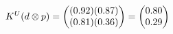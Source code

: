 \documentclass[preview]{standalone}
\begin{document}
\begin{align*}
\special{dvisvgm:raw <g id='unique000'>}K^U(d \otimes p) = \begin{pmatrix} (0.92)(0.87) \\ (0.81)(0.36) \end{pmatrix} = \begin{pmatrix} 0.80 \\ 0.29 \end{pmatrix}\special{dvisvgm:raw </g>}
\end{align*}
\end{document}
